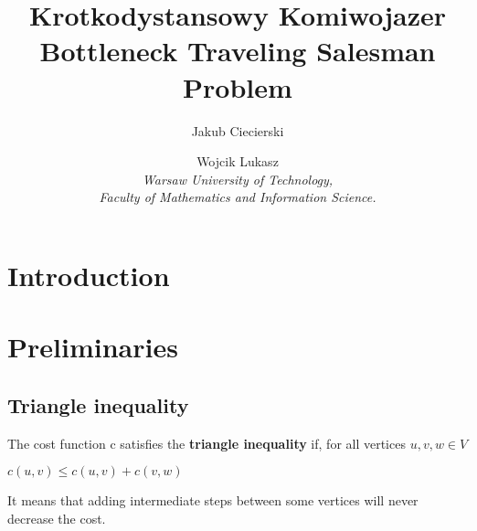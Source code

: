 \documentclass[runningheads, a4paper]{llncs}
\begin{document}
\mainmatter  %

\title{Krotkodystansowy Komiwojazer \\ Bottleneck Traveling Salesman Problem}


\author{Jakub Ciecierski \and Wojcik Lukasz \\ 
\textit{Warsaw University of Technology, \\
Faculty of Mathematics and Information Science.}}
%


\maketitle





\section{Introduction}


\section{Preliminaries}

\subsection{Triangle inequality}

The cost function c satisfies the \textbf{triangle inequality} if, for all vertices $u,v,w \in V$

\begin{center}
	$c(u,v)\leq c(u,v) + c(v,w)$
\end{center}

It means that adding intermediate steps between some vertices will never decrease the cost.
\end{document}
